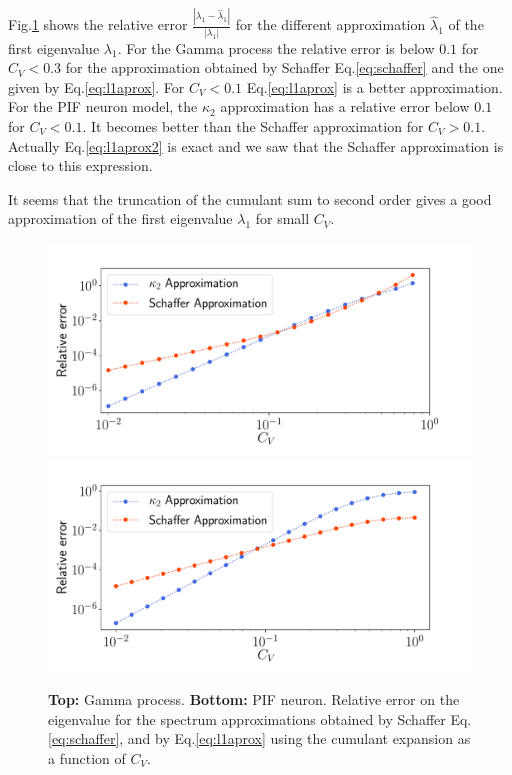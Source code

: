 \documentclass[a4paper,11pt,twoside]{article}
\numberwithin{equation}{section}
\begin{document}
Fig.\ref{fig:kumulant} shows the relative error $\frac{|\lambda_1 -\hat{\lambda}_1|}{|\lambda_1|}$ for the different approximation $\hat{\lambda}_1$ of the first eigenvalue $\lambda_1$. For the Gamma process the relative error is below $0.1$ for $C_V<0.3$ for the approximation obtained by Schaffer Eq.\eqref{eq:schaffer} and the one given by Eq.\eqref{eq:l1aprox}. For $C_V<0.1$ Eq.\eqref{eq:l1aprox} is a better approximation. For
the PIF neuron model, the $\kappa_2$ approximation has a relative error below $0.1$ for $C_V<0.1$. It becomes better than the Schaffer approximation for $C_V>0.1$. Actually Eq.\eqref{eq:l1aprox2} is exact and we saw that the Schaffer approximation is close to this expression.

It seems that the truncation of the cumulant sum to second order gives a good approximation of the first eigenvalue $\lambda_1$ for small $C_V$.


\begin{figure}[h!]
	\centering
	\includegraphics[width=0.8\linewidth]{kumulant_gamma.pdf}
\centering
	\includegraphics[width=0.8\linewidth]{kumulant_pif.pdf}
	\caption{\textbf{Top:} Gamma process. \textbf{Bottom:} PIF neuron. Relative error on the eigenvalue for the spectrum approximations obtained by Schaffer Eq.\eqref{eq:schaffer}, and by Eq.\eqref{eq:l1aprox} using the cumulant expansion as a function of $C_V$.}
	\label{fig:kumulant}
\end{figure}
\end{document}
